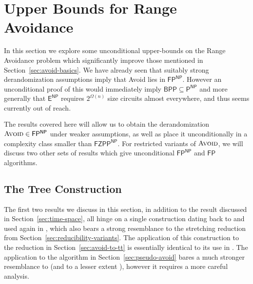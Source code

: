 \documentclass[11pt]{article}
\newcommand{\todo}[1]{\textcolor{red}{TODO: #1}}
\newcommand{\dash}{\text{-}}
\newcommand{\avoid}{\textsc{Avoid}}
\begin{document}

\section{Upper Bounds for Range Avoidance}\label{sec:upper-bounds}
In this section we explore some unconditional upper-bounds on the Range Avoidance problem which significantly improve those mentioned in Section~\ref{sec:avoid-basics}. We have already seen that suitably strong derandomization assumptions imply that Avoid lies in $\mathsf{FP^{NP}}$. However an unconditional proof of this would immediately imply $\mathsf{BPP} \subseteq \mathsf{P^{NP}}$ and more generally that $\mathsf{E^{NP}}$ requires $2^{\Omega(n)}$ size circuits almost everywhere, and thus seems currently out of reach. 

The results covered here will allow us to obtain the derandomization $\avoid \in \mathsf{FP^{NP}}$ under weaker assumptions, as well as place it unconditionally in a complexity class smaller than $\mathsf{FZPP^{NP}}$. For restricted variants of $\avoid$, we will discuss two other sets of results which give unconditional $\mathsf{FP^{NP}}$ and $\mathsf{FP}$ algorithms.
\subsection{The Tree Construction}\label{sec:tree}
The first two results we discuss in this section, in addition to the result discussed in Section~\ref{sec:time-space}, all hinge on a single construction dating back to \cite{Paris-Wilkie-Woods,GGM} and used again in \cite{Jerabek}, which also bears a strong resemblance to the stretching reduction from Section~\ref{sec:reducibility-variants}. The application of this construction to the reduction in Section~\ref{sec:avoid-to-tt} is essentially identical to its use in \cite{Jerabek}. The application to the algorithm in Section~\ref{sec:pseudo-avoid} bares a much stronger resemblance to \cite{Paris-Wilkie-Woods} (and to a lesser extent \cite{GGM}), however it requires a more careful analysis.
\end{document}
